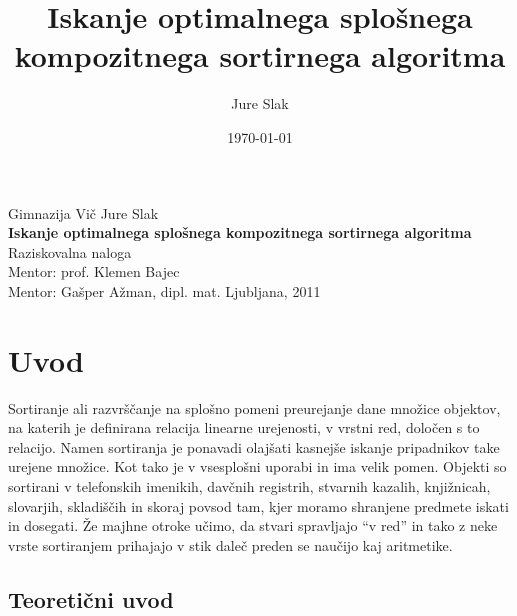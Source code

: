 \documentclass[a4paper,oneside]{article}
\title{Iskanje optimalnega splošnega kompozitnega sortirnega algoritma}
\author{Jure Slak}
\date{\today}
\begin{document}
\addto\captionsslovene {
\renewcommand\bibname{}
}
\renewcommand\refname{}


\thispagestyle{empty}

\begin{center}{\large
  Gimnazija Vič
  \vfill
  Jure Slak\\[2mm]
  {\bf Iskanje optimalnega splošnega kompozitnega sortirnega algoritma}\\[10mm]
  Raziskovalna naloga\\[1cm]
  Mentor: prof. Klemen Bajec \\[2mm]
  Mentor: Gašper Ažman, dipl. mat.}
  \vfill
  \vfill
  \large Ljubljana, 2011
\end{center}
\pagebreak

\thispagestyle{empty}
\tableofcontents
\pagebreak

\section{Uvod}

Sortiranje ali razvrščanje na splošno pomeni preurejanje dane množice objektov, na katerih
je definirana relacija linearne urejenosti, v vrstni red, določen s to relacijo.
Namen sortiranja je ponavadi olajšati kasnejše iskanje pripadnikov take urejene množice. Kot tako je
v vsesplošni uporabi in ima velik pomen. Objekti so sortirani v telefonskih imenikih,
davčnih registrih, stvarnih kazalih, knjižnicah, slovarjih, skladiščih in skoraj povsod tam,
kjer moramo shranjene predmete iskati in dosegati. Že majhne otroke učimo, da stvari spravljajo
``v red'' in tako z neke vrste sortiranjem prihajajo v stik daleč preden se naučijo kaj
aritmetike.

\subsection{Teoretični uvod}


\end{document}

